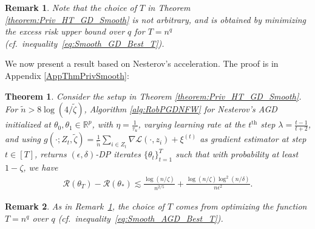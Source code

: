 \documentclass{article}
\newtheorem{theorem}{Theorem}
\newtheorem{remark}{\textbf{Remark}}
\begin{document}
\begin{remark}
\label{RemChooseT}
Note that the choice of $T$ in Theorem \ref{theorem:Priv_HT_GD_Smooth} is not arbitrary, and is obtained by minimizing the excess risk upper bound over $q$ for $T = n^q$ (cf.\ inequality~\eqref{eq:Smooth_GD_Best_T}).
\end{remark}

We now present a result based on Nesterov's acceleration. The proof is in Appendix \ref{AppThmPrivSmooth}:

\begin{theorem}
\label{theorem:Priv_HT_AGD_Smooth}
Consider the setup in Theorem \ref{theorem:Priv_HT_GD_Smooth}. For $\widetilde{n} > 8\log(4/\widetilde{\zeta})$, Algorithm \ref{alg:RobPGDNFW} for Nesterov's AGD initialized at $\theta_0, \theta_1 \in \mathbb{R}^p$, with $\eta = \frac{1}{\tau_u}$, varying learning rate at the $t^{\text{th}}$ step $\lambda = \frac{t - 1}{t + 2}$, and using $g(\cdot; Z_t, \widetilde{\zeta}) = \frac{1}{\widetilde{n}}\sum_{i \in Z_t}\nabla\mathcal{L}(\cdot, z_i) + \xi^{(t)}$ as gradient estimator at step $t \in [T]$, returns $(\epsilon, \delta)$-DP iterates $\{\theta_t\}_{t = 1}^T$ such that with probability at least $1 - \zeta$, we have
\begin{align*}
\mathcal{R}(\theta_T) - \mathcal{R}(\theta_*) \lesssim \frac{\log(n/\zeta)}{n^{2/5}} + \frac{\log(n/\zeta)\log^2(n/\delta)}{n\epsilon^2}.
\end{align*}
\end{theorem}

\begin{remark}
As in Remark~\ref{RemChooseT}, the choice of $T$ comes from optimizing the function $T = n^q$ over $q$ (cf.\ inequality~\eqref{eq:Smooth_AGD_Best_T}).
\end{remark}
\end{document}

